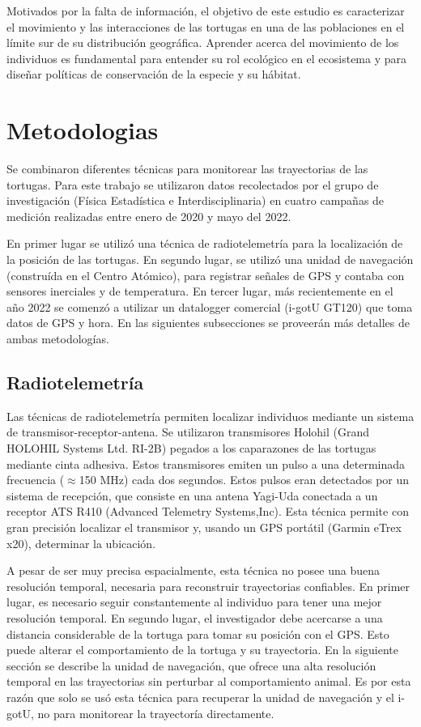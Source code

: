 Motivados por la falta de información, el objetivo de este estudio es caracterizar el movimiento y las interacciones de las tortugas en una de las poblaciones en el límite sur de su distribución geográfica. Aprender acerca del movimiento de los individuos es fundamental para entender su rol ecológico en el ecosistema y para diseñar políticas de conservación de la especie y su hábitat.
 
 
\section{Metodologias}
 
Se combinaron diferentes técnicas para monitorear las trayectorias de las tortugas. Para este trabajo se utilizaron datos recolectados por  el grupo de investigación (Física Estadística e Interdisciplinaria) en cuatro campañas de medición realizadas entre enero de 2020 y mayo del 2022.
 
En primer lugar se utilizó una técnica de radiotelemetría para la localización de la posición de las tortugas. En segundo lugar, se utilizó una unidad de navegación (construída en el Centro Atómico), para registrar señales de GPS y contaba con sensores inerciales y de temperatura. En tercer lugar, más recientemente en el año 2022 se comenzó a utilizar un datalogger comercial (i-gotU GT120) que toma datos de GPS y hora. En las siguientes subsecciones se proveerán más detalles de ambas metodologías.
 
\subsection{Radiotelemetría}
Las técnicas de radiotelemetría permiten localizar individuos mediante un sistema de transmisor-receptor-antena. Se utilizaron transmisores Holohil (Grand HOLOHIL Systems Ltd. RI-2B) pegados a los caparazones de las tortugas mediante cinta adhesiva. Estos transmisores emiten un pulso a una determinada frecuencia ($\approx$150 MHz) cada dos segundos. Estos pulsos eran detectados por un sistema de recepción, que consiste en una antena Yagi-Uda conectada a un receptor ATS R410 (Advanced Telemetry Systems,Inc). Esta técnica permite con gran precisión localizar el transmisor y, usando un GPS portátil (Garmin eTrex
x20), determinar la ubicación.
 
A pesar de ser muy precisa espacialmente, esta técnica no posee una buena resolución temporal, necesaria para reconstruir trayectorias confiables. En primer lugar, es necesario seguir constantemente al individuo para tener una mejor resolución temporal. En segundo lugar, el investigador debe acercarse a una distancia considerable de la tortuga para tomar su posición con el GPS. Esto puede alterar el comportamiento de la tortuga y su trayectoria. En la siguiente sección se describe la unidad de navegación, que ofrece una alta resolución temporal en las trayectorias sin perturbar al comportamiento animal. Es por esta razón que solo se usó esta técnica para recuperar la unidad de navegación y el i-gotU, no para monitorear la trayectoría directamente.
 
